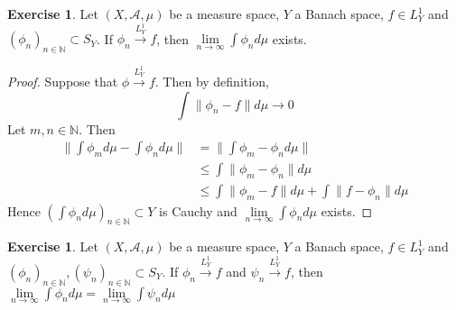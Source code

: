 \documentclass[12pt]{amsart}
\theoremstyle{definition}
\newtheorem{ex}[definition]{Exercise}
\newcommand{\N}{\mathbb{N}}
\newcommand{\MA}{\mathcal{A}}
\newcommand{\limn}{\lim \limits_{n \rightarrow \infty}}
\newcommand{\conv}[1]{\xrightarrow{#1}}
\begin{document}
	\begin{ex}
	Let $(X, \MA, \mu)$ be a measure space, $Y$ a Banach space, $f \in L^1_Y$ and $(\phi_n)_{n \in \N} \subset S_Y$. If $\phi_n \conv{L^1_Y} f$, then $\limn \int \phi_n d\mu $ exists.
	\end{ex}
	
	\begin{proof}
	Suppose that $\phi \conv{L^1_Y} f$. Then by definition, $$\int \|\phi_n -f\| d\mu \rightarrow 0$$ Let $m,n \in \N$. Then 
	\begin{align*}
	\bigg \|\int \phi_m d\mu - \int \phi_n d\mu \bigg \| 
	&= \bigg \| \int \phi_m  - \phi_n d\mu  \bigg \| \\
	& \leq  \int \|\phi_m  - \phi_n\| d \mu \\
	& \leq \int \|\phi_m  - f \| d \mu + \int \|f  - \phi_n\| d \mu
	\end{align*}
	Hence $( \int \phi_n  d \mu)_{n \in \N} \subset Y$ is Cauchy and $\lim\limits_{n \rightarrow \infty} \int \phi_n d\mu$ exists.
\end{proof}		

	\begin{ex}
	Let $(X, \MA, \mu)$ be a measure space, $Y$ a Banach space, $f \in L^1_Y$ and $(\phi_n)_{n \in \N}, (\psi_n)_{n \in \N} \subset S_Y$. If $\phi_n \conv{L^1_Y} f$ and $\psi_n \conv{L^1_Y} f$, then $\lim\limits_{n \rightarrow \infty} \int \phi_n d\mu = \lim\limits_{n \rightarrow \infty} \int \psi_n d\mu$
	\end{ex}
	
\end{document}
